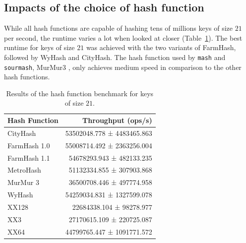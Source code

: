 \subsection*{Impacts of the choice of hash function}
While all hash functions are capable of hashing tens of millions keys of size
$21$ per second, the runtime varies a lot when looked at closer
(Table~\ref{ta:hashbenchmark}). The best runtime for keys of size $21$ was
achieved with the two variants of FarmHash, followed by WyHash and CityHash. The
hash function used by \texttt{mash} and \texttt{sourmash}, MurMur3
\cite{ondovMashFastGenome2016,irberLightweightCompositionalAnalysis2022}, only
achieves medium speed in comparison to the other hash functions.  

\begin{table}[]
  \centering
  \begin{tabular}{@{}lr@{}}
  \toprule
  \textbf{Hash Function }& \textbf{Throughput (ops/s)}                      \\
  \midrule
  CityHash      & 53502048.778 ± 4483465.863   \\
  FarmHash 1.0  & 55008714.492 ± 2363256.004   \\
  FarmHash 1.1  & 54678293.943 ±  482133.235   \\
  MetroHash     & 51132334.855 ±  307903.868   \\
  MurMur 3      & 36500708.446 ±  497774.958   \\
  WyHash        & 54259034.831 ± 1327599.078   \\
  XX128         & 22684338.104 ±   98278.977   \\
  XX3           & 27170615.109 ±  220725.087   \\
  XX64          & 44799765.447 ± 1091771.572  \\
  \bottomrule
  \end{tabular}
  \caption{Results of the hash function benchmark for keys of size $21$.}
  \label{ta:hashbenchmark}
  \end{table}


